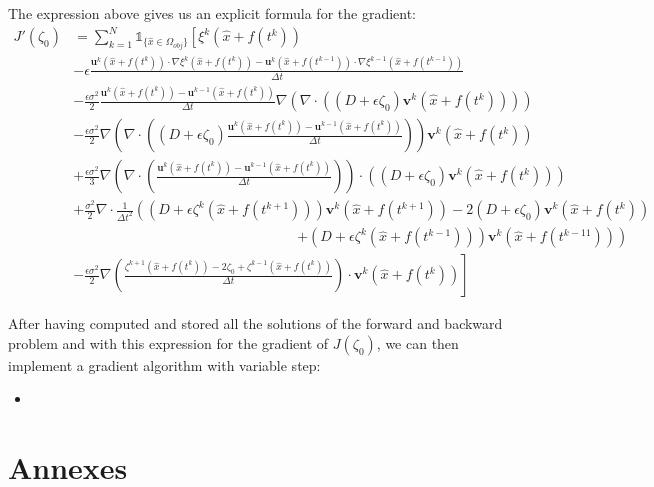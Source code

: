 \documentclass[11pt,a4paper]{article}
\begin{document}
		The expression above gives us an explicit formula for the gradient: 
		\begin{equation*}
			\begin{split}
				J'(\zeta_0) &= \sum^{N}_{k=1} \mathds{1}_{\{\hat{x} \in \Omega_{obj}\}} \left[ \xi^k(\hat{x} + f(t^k)) \right.\\
				&  - \epsilon \frac{\mathbf{u}^k(\hat{x} + f(t^k)) \cdot \nabla \xi^k(\hat{x} + f(t^{k})) - \mathbf{u}^k(\hat{x} + f(t^{k-1})) \cdot \nabla \xi^{k-1}(\hat{x} + f(t^{k-1}))}{\Delta t} \\
				&  - \frac{\epsilon \sigma^2}{2}  \frac{\mathbf{u}^k(\hat{x} + f(t^k)) - \mathbf{u}^{k-1}(\hat{x} + f(t^k))}{\Delta t}  \nabla\left( \nabla \cdot \left( (D + \epsilon \zeta_0) \mathbf{v}^k(\hat{x} + f(t^k)) \right) \right)\\
				&  - \frac{\epsilon \sigma^2}{2} \nabla \left( \nabla \cdot \left((D+\epsilon \zeta_0)\frac{\mathbf{u}^k(\hat{x} + f(t^k)) - \mathbf{u}^{k-1}(\hat{x} + f(t^k))}{\Delta t}\right) \right)  \mathbf{v}^k(\hat{x} + f(t^k))  \\
				& + \frac{\epsilon \sigma^2}{3} \nabla \left( \nabla \cdot \left( \frac{\mathbf{u}^k(\hat{x} + f(t^k)) - \mathbf{u}^{k-1}(\hat{x} + f(t^k))}{\Delta t} \right) \right) \cdot \left(  (D + \epsilon \zeta_0) \mathbf{v}^k(\hat{x} + f(t^k)) \right) \\
				&  + \frac{\sigma^2}{2} \nabla \cdot \frac{1}{\Delta t^2} \left( (D + \epsilon \zeta^k(\hat{x} + f(t^{k+1}))) \mathbf{v}^k(\hat{x} + f(t^{k+1})) -2(D + \epsilon \zeta_0) \mathbf{v}^k(\hat{x} + f(t^{k})) \right. \\
				& \qquad \qquad \qquad \qquad \qquad \qquad \qquad \qquad  \left. + (D + \epsilon \zeta^k(\hat{x} + f(t^{k-1}))) \mathbf{v}^k(\hat{x} + f(t^{k-11}))\right)\\
				& \left. - \frac{\epsilon \sigma^2}{2} \nabla  \left(\frac{\zeta^{k+1}(\hat{x} + f(t^k)) - 2\zeta_0 + \zeta^{k-1}(\hat{x} + f(t^k))}{\Delta t} \right) \cdot \mathbf{v}^k(\hat{x} + f(t^k)) \right]
			\end{split}
		\end{equation*}
		
		After having computed and stored all the solutions of the forward and backward problem and with this expression for the gradient of $J(\zeta_0)$, we can then implement a gradient algorithm with variable step:
		\begin{itemize}
			\item 
		\end{itemize}
		
		
		
	
		\pagebreak	
	
	\section*{Annexes}
		
		\pagebreak
		
		 
		
		
		\appendix
\end{document}
